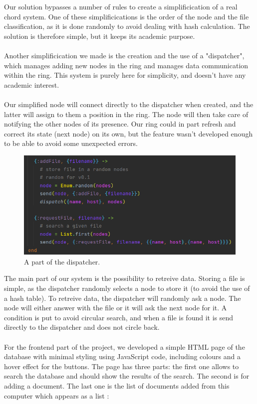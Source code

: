 \documentclass{article}
\begin{document}
Our solution bypasses a number of rules to create a simplificication of a real chord system. One of these simplificications is the order of the node and the file classification, as it is done randomly to avoid dealing with hash calculation. The solution is therefore simple, but it keeps its academic purpose.
\\\\
Another simplificication we made is the creation and the use of a "dispatcher", which manages adding new nodes in the ring and manages data communication within the ring. This system is purely here for simplicity, and doesn't have any academic interest.
\\\\
Our simplified node will connect directly to the dispatcher when created, and the latter will assign to them a position in the ring. The node will then take care of notifying the other nodes of its presence. Our ring could in part refresh and correct its state (next node) on its own, but the feature wasn't developed enough to be able to avoid some unexpected errors.
\begin{figure}[H]
  \centering
  \includegraphics[width=\textwidth]{img/dispatch.png}
  \caption{A part of the dispatcher.}
  \label{figure 2 :}
\end{figure}
The main part of our system is the possibility to retreive data. Storing a file is simple, as the dispatcher randomly selects a node to store it (to avoid the use of a hash table). To retreive data, the dispatcher will randomly ask a node. The node will either answer with the file or it will ask the next node for it. A condition is put to avoid circular search, and when a file is found it is send directly to the dispatcher and does not circle back.
\\\\
For the frontend part of the project, we developed a simple HTML page of the database with minimal styling using JavaScript code, including colours and a hover effect for the buttons. 
The page has three parts: the first one allows to search the database and should show the results of the search. The second is for adding a document. The last one is the list of documents added from this computer which appears as a list :
\end{document}
